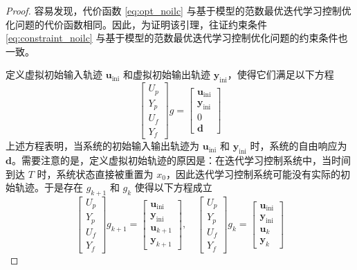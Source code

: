 \begin{proof}
	容易发现，代价函数 \eqref{eq:opt_noilc} 与基于模型的范数最优迭代学习控制优化问题的代价函数相同。因此，为证明该引理，往证约束条件 \eqref{eq:constraint_noilc} 与基于模型的范数最优迭代学习控制优化问题的约束条件也一致。
	
	定义虚拟初始输入轨迹 \( \mathbf{u}_{\mathrm{ini}} \) 和虚拟初始输出轨迹 \( \mathbf{y}_{\mathrm{ini}} \)，使得它们满足以下方程
	\begin{equation}
		\begin{bmatrix} U_p \\ Y_p \\ U_f \\ Y_f \end{bmatrix} g = \begin{bmatrix} \mathbf{u}_{\mathrm{ini}} \\ \mathbf{y}_{\mathrm{ini}} \\ 0 \\ \mathbf{d} \end{bmatrix}
		\label{eq:virtual_initial}
	\end{equation}
	上述方程表明，当系统的初始输入输出轨迹为 \( \mathbf{u}_{\mathrm{ini}} \) 和 \( \mathbf{y}_{\mathrm{ini}} \) 时，系统的自由响应为 \( \mathbf{d} \)。需要注意的是，定义虚拟初始轨迹的原因是：在迭代学习控制系统中，当时间到达 \( T \) 时，系统状态直接被重置为 \( x_0 \)，因此迭代学习控制系统可能没有实际的初始轨迹。于是存在 \( g_{k+1} \) 和 \( g_k \) 使得以下方程成立
	\begin{equation}
		\begin{bmatrix} U_p \\ Y_p \\ U_f \\ Y_f \end{bmatrix} g_{k+1} = \begin{bmatrix} \mathbf{u}_{\mathrm{ini}} \\ \mathbf{y}_{\mathrm{ini}} \\ \mathbf{u}_{k+1} \\ \mathbf{y}_{k+1} \end{bmatrix}, \quad
		\begin{bmatrix} U_p \\ Y_p \\ U_f \\ Y_f \end{bmatrix} g_{k} = \begin{bmatrix} \mathbf{u}_{\mathrm{ini}} \\ \mathbf{y}_{\mathrm{ini}} \\ \mathbf{u}_k \\ \mathbf{y}_k \end{bmatrix}

\end{equation}
\end{proof}
